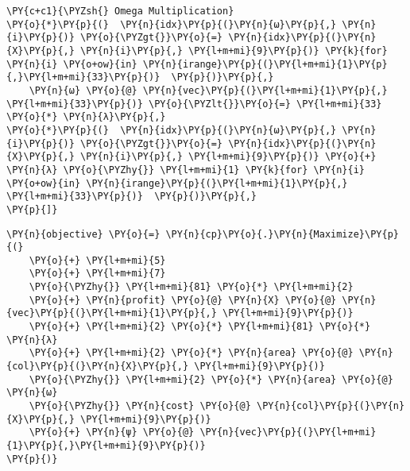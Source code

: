\begin{tcolorbox}[breakable, size=fbox, boxrule=1pt, pad at break*=1mm,colback=cellbackground, colframe=cellborder]
\begin{Verbatim}[commandchars=\\\{\}]
    \PY{c+c1}{\PYZsh{} Omega Multiplication}
\PY{o}{*}\PY{p}{(}  \PY{n}{idx}\PY{p}{(}\PY{n}{ω}\PY{p}{,} \PY{n}{i}\PY{p}{)} \PY{o}{\PYZgt{}}\PY{o}{=} \PY{n}{idx}\PY{p}{(}\PY{n}{X}\PY{p}{,} \PY{n}{i}\PY{p}{,} \PY{l+m+mi}{9}\PY{p}{)} \PY{k}{for} \PY{n}{i} \PY{o+ow}{in} \PY{n}{irange}\PY{p}{(}\PY{l+m+mi}{1}\PY{p}{,}\PY{l+m+mi}{33}\PY{p}{)}  \PY{p}{)}\PY{p}{,}
    \PY{n}{ω} \PY{o}{@} \PY{n}{vec}\PY{p}{(}\PY{l+m+mi}{1}\PY{p}{,} \PY{l+m+mi}{33}\PY{p}{)} \PY{o}{\PYZlt{}}\PY{o}{=} \PY{l+m+mi}{33} \PY{o}{*} \PY{n}{λ}\PY{p}{,}
\PY{o}{*}\PY{p}{(}  \PY{n}{idx}\PY{p}{(}\PY{n}{ω}\PY{p}{,} \PY{n}{i}\PY{p}{)} \PY{o}{\PYZgt{}}\PY{o}{=} \PY{n}{idx}\PY{p}{(}\PY{n}{X}\PY{p}{,} \PY{n}{i}\PY{p}{,} \PY{l+m+mi}{9}\PY{p}{)} \PY{o}{+} \PY{n}{λ} \PY{o}{\PYZhy{}} \PY{l+m+mi}{1} \PY{k}{for} \PY{n}{i} \PY{o+ow}{in} \PY{n}{irange}\PY{p}{(}\PY{l+m+mi}{1}\PY{p}{,} \PY{l+m+mi}{33}\PY{p}{)}  \PY{p}{)}\PY{p}{,}
\PY{p}{]}
    \end{Verbatim}
\end{tcolorbox}

\pagebreak

\begin{tcolorbox}[breakable, size=fbox, boxrule=1pt, pad at break*=1mm,colback=cellbackground, colframe=cellborder]
    \begin{Verbatim}[commandchars=\\\{\}]
\PY{n}{objective} \PY{o}{=} \PY{n}{cp}\PY{o}{.}\PY{n}{Maximize}\PY{p}{(}
    \PY{o}{+} \PY{l+m+mi}{5}
    \PY{o}{+} \PY{l+m+mi}{7}
    \PY{o}{\PYZhy{}} \PY{l+m+mi}{81} \PY{o}{*} \PY{l+m+mi}{2}
    \PY{o}{+} \PY{n}{profit} \PY{o}{@} \PY{n}{X} \PY{o}{@} \PY{n}{vec}\PY{p}{(}\PY{l+m+mi}{1}\PY{p}{,} \PY{l+m+mi}{9}\PY{p}{)}
    \PY{o}{+} \PY{l+m+mi}{2} \PY{o}{*} \PY{l+m+mi}{81} \PY{o}{*} \PY{n}{λ}
    \PY{o}{+} \PY{l+m+mi}{2} \PY{o}{*} \PY{n}{area} \PY{o}{@} \PY{n}{col}\PY{p}{(}\PY{n}{X}\PY{p}{,} \PY{l+m+mi}{9}\PY{p}{)}
    \PY{o}{\PYZhy{}} \PY{l+m+mi}{2} \PY{o}{*} \PY{n}{area} \PY{o}{@} \PY{n}{ω}
    \PY{o}{\PYZhy{}} \PY{n}{cost} \PY{o}{@} \PY{n}{col}\PY{p}{(}\PY{n}{X}\PY{p}{,} \PY{l+m+mi}{9}\PY{p}{)}
    \PY{o}{+} \PY{n}{ψ} \PY{o}{@} \PY{n}{vec}\PY{p}{(}\PY{l+m+mi}{1}\PY{p}{,}\PY{l+m+mi}{9}\PY{p}{)}
\PY{p}{)}
    \end{Verbatim}
\end{tcolorbox}

